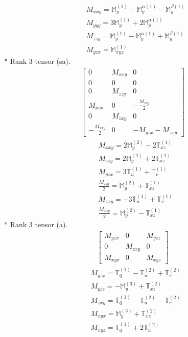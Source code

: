 \documentclass[fleqn,8pt,landscape]{jsarticle}
\begin{document}
\begin{align*}
& M_{xxy} = \mathbb{M}_{y}^{(1)} - \mathbb{M}_{y}^{\alpha(1)} - \mathbb{M}_{y}^{\beta(1)} \\
& M_{yyy} = 3 \mathbb{M}_{y}^{(1)} + 2 \mathbb{M}_{y}^{\alpha(1)} \\
& M_{zzy} = \mathbb{M}_{y}^{(1)} - \mathbb{M}_{y}^{\alpha(1)} + \mathbb{M}_{y}^{\beta(1)} \\
& M_{yzx} = \mathbb{M}_{xyz}^{(1)}
\end{align*}
* Rank 3 tensor (sa).
\begin{align*}
\begin{bmatrix} 0 & M_{xxy} & 0 \\ 0 & 0 & 0 \\ 0 & M_{zzy} & 0 \\ M_{yzx} & 0 & - \frac{M_{zzy}}{2} \\ 0 & M_{zxy} & 0 \\ - \frac{M_{xxy}}{2} & 0 & - M_{yzx} - M_{zxy} \end{bmatrix}
\end{align*}
\begin{align*}
& M_{xxy} = 2 \mathbb{M}_{y}^{(2)} - 2 \mathbb{T}_{xz}^{(1)} \\
& M_{zzy} = 2 \mathbb{M}_{y}^{(2)} + 2 \mathbb{T}_{xz}^{(1)} \\
& M_{yzx} = 3 \mathbb{T}_{u}^{(1)} + \mathbb{T}_{v}^{(1)} \\
& \frac{M_{zzy}}{2} = \mathbb{M}_{y}^{(2)} + \mathbb{T}_{xz}^{(1)} \\
& M_{zxy} = - 3 \mathbb{T}_{u}^{(1)} + \mathbb{T}_{v}^{(1)} \\
& \frac{M_{xxy}}{2} = \mathbb{M}_{y}^{(2)} - \mathbb{T}_{xz}^{(1)}
\end{align*}
* Rank 3 tensor (a).
\begin{align*}
\begin{bmatrix} M_{yzx} & 0 & M_{yzz} \\ 0 & M_{zxy} & 0 \\ M_{xyx} & 0 & M_{xyz} \end{bmatrix}
\end{align*}
\begin{align*}
& M_{yzx} = \mathbb{T}_{0}^{(1)} - \mathbb{T}_{u}^{(2)} + \mathbb{T}_{v}^{(2)} \\
& M_{yzz} = - \mathbb{M}_{y}^{(3)} + \mathbb{T}_{xz}^{(2)} \\
& M_{zxy} = \mathbb{T}_{0}^{(1)} - \mathbb{T}_{u}^{(2)} - \mathbb{T}_{v}^{(2)} \\
& M_{xyx} = \mathbb{M}_{y}^{(3)} + \mathbb{T}_{xz}^{(2)} \\
& M_{xyz} = \mathbb{T}_{0}^{(1)} + 2 \mathbb{T}_{u}^{(2)}
\end{align*}
\end{document}
